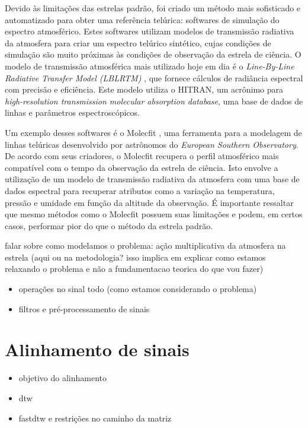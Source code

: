 Devido às limitações das estrelas padrão, foi criado um método mais sofisticado e automatizado para obter uma referência telúrica: softwares de simulação do espectro atmosférico. Estes softwares utilizam modelos de transmissão radiativa da atmosfera para criar um espectro telúrico sintético, cujas condições de simulação são muito próximas às condições de observação da estrela de ciência. O modelo de transmissão atmosférica mais utilizado hoje em dia é o \textit{Line-By-Line Radiative Transfer Model (LBLRTM)} \citep{2005JQSRT..91..233C}, que fornece cálculos de radiância espectral com precisão e eficiência. Este modelo utiliza o HITRAN, um acrônimo para \textit{high-resolution transmission molecular absorption database}, uma base de dados de linhas e parâmetros espectroscópicos. 

Um exemplo desses softwares é o Molecfit \citep{smette2015molecfit}, uma ferramenta para a modelagem de linhas telúricas desenvolvido por astrônomos do \textit{European Southern Observatory}. De acordo com seus criadores, o Molecfit recupera o perfil atmosférico mais compatível com o tempo da observação da estrela de ciência. Isto envolve a utilização de um modelo de transmissão radiativa da atmosfera com uma base de dados espectral para recuperar atributos como a variação na temperatura, pressão e umidade em função da altitude da observação. É importante ressaltar que mesmo métodos como o Molecfit possuem suas limitações e podem, em certos casos, performar pior do que o método da estrela padrão.


falar sobre como modelamos o problema: ação multiplicativa da atmosfera na estrela (aqui ou na metodologia? isso implica em explicar como estamos relaxando o problema e não a fundamentacao teorica do que vou fazer)
\begin{itemize}
    \item operações no sinal todo (como estamos considerando o problema)
    \item filtros e pré-processamento de sinais
\end{itemize}


\section{Alinhamento de sinais}
\begin{itemize}
    \item objetivo do alinhamento 
    \item dtw
    \item fastdtw e restrições no caminho da matriz
\end{itemize}



